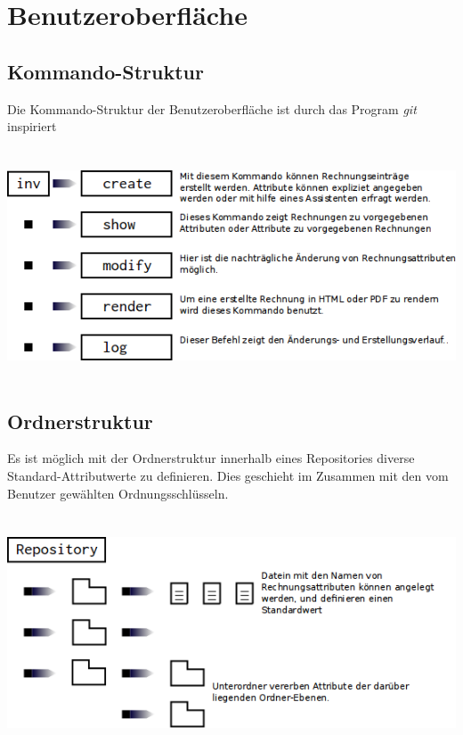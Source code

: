 
\section{Benutzeroberfläche}

\subsection{Kommando-Struktur}
Die Kommando-Struktur der Benutzeroberfläche ist durch das Program \emph{git} inspiriert\\
\\\\
\includegraphics[width=\textwidth]{kommando-struktur.png}
\\
\\
\subsection{Ordnerstruktur}
Es ist möglich mit der Ordnerstruktur innerhalb eines Repositories diverse
Standard-Attributwerte zu definieren. Dies geschieht im Zusammen mit den vom
Benutzer gewählten Ordnungsschlüsseln.\\
\\\\
\includegraphics[width=\textwidth]{ordnerstruktur-struktur.png}